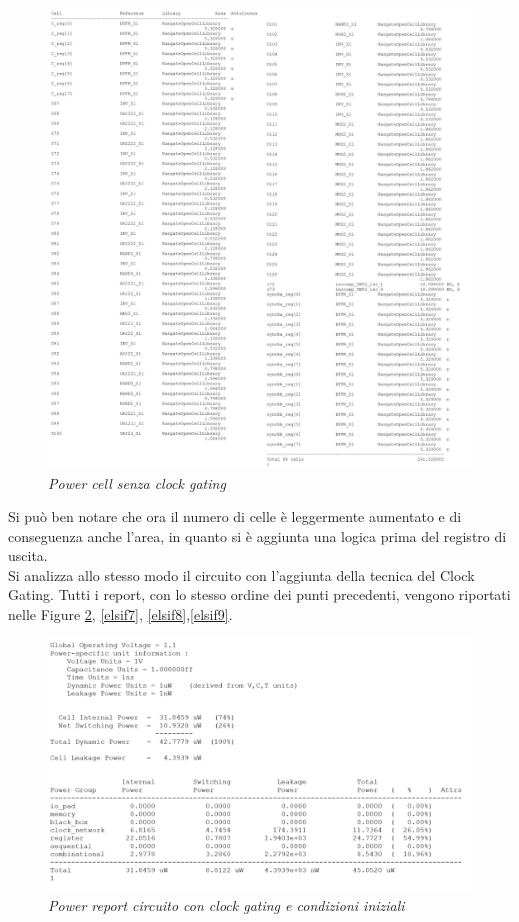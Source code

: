 \begin{figure}[!htb]
	\centering
	\includegraphics[scale=0.25]{immagini/elsif5}
	\caption{\textit{Power cell senza clock gating}}
	\label{elsif5}
\end{figure}
\noindent Si può ben notare che ora il numero di celle è leggermente aumentato e di conseguenza anche l'area, in quanto si è aggiunta una logica prima del registro di uscita.\\
Si analizza allo stesso modo il circuito con l'aggiunta della tecnica del Clock Gating. Tutti i report, con lo stesso ordine dei punti precedenti, vengono riportati nelle Figure \ref{elsif6}, \ref{elsif7}, \ref{elsif8},\ref{elsif9}.\\
\begin{figure}[!htb]
	\centering
	\includegraphics[scale=0.65]{immagini/elsif6}
	\caption{\textit{Power report circuito con clock gating e condizioni iniziali}}
	\label{elsif6}
\end{figure}
